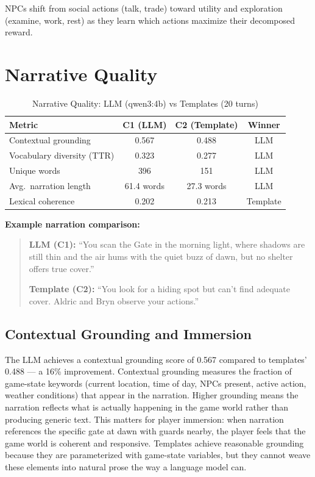 \documentclass[12pt, a4paper, oneside]{report}
\begin{document}
NPCs shift from social actions (talk, trade) toward utility and exploration (examine, work, rest) as they learn which actions maximize their decomposed reward.

\section{Narrative Quality}
\label{sec:narrative-quality}

\begin{table}[H]
\centering
\caption{Narrative Quality: LLM (qwen3:4b) vs Templates (20 turns)}
\label{tab:narrative}
\begin{tabular}{lccc}
\toprule
\textbf{Metric} & \textbf{C1 (LLM)} & \textbf{C2 (Template)} & \textbf{Winner} \\
\midrule
Contextual grounding & 0.567 & 0.488 & LLM \\
Vocabulary diversity (TTR) & 0.323 & 0.277 & LLM \\
Unique words & 396 & 151 & LLM \\
Avg.\ narration length & 61.4 words & 27.3 words & LLM \\
Lexical coherence & 0.202 & 0.213 & Template \\
\bottomrule
\end{tabular}
\end{table}

\textbf{Example narration comparison:}

\begin{quote}
\textbf{LLM (C1):} ``You scan the Gate in the morning light, where shadows are still thin and the air hums with the quiet buzz of dawn, but no shelter offers true cover.''

\textbf{Template (C2):} ``You look for a hiding spot but can't find adequate cover. Aldric and Bryn observe your actions.''
\end{quote}

\subsection{Contextual Grounding and Immersion}

The LLM achieves a contextual grounding score of 0.567 compared to templates' 0.488 --- a 16\% improvement. Contextual grounding measures the fraction of game-state keywords (current location, time of day, NPCs present, active action, weather conditions) that appear in the narration. Higher grounding means the narration reflects what is actually happening in the game world rather than producing generic text. This matters for player immersion: when narration references the specific gate at dawn with guards nearby, the player feels that the game world is coherent and responsive. Templates achieve reasonable grounding because they are parameterized with game-state variables, but they cannot weave these elements into natural prose the way a language model can.
\end{document}
